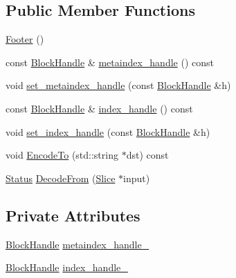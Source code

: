 \subsection*{Public Member Functions}
\begin{DoxyCompactItemize}
\item 
\hyperlink{classleveldb_1_1_footer_ab549912506721bad11eda55be5a04a82}{Footer} ()
\item 
const \hyperlink{classleveldb_1_1_block_handle}{Block\+Handle} \& \hyperlink{classleveldb_1_1_footer_a44f2334ed064f7045d76b898f5fadb6a}{metaindex\+\_\+handle} () const 
\item 
void \hyperlink{classleveldb_1_1_footer_ac937207010f61550c703b2d732422566}{set\+\_\+metaindex\+\_\+handle} (const \hyperlink{classleveldb_1_1_block_handle}{Block\+Handle} \&h)
\item 
const \hyperlink{classleveldb_1_1_block_handle}{Block\+Handle} \& \hyperlink{classleveldb_1_1_footer_aae1a72a668da9eae3fa2f6620e3ea559}{index\+\_\+handle} () const 
\item 
void \hyperlink{classleveldb_1_1_footer_ae2f4be5947f5e4983a160d6d01edea68}{set\+\_\+index\+\_\+handle} (const \hyperlink{classleveldb_1_1_block_handle}{Block\+Handle} \&h)
\item 
void \hyperlink{classleveldb_1_1_footer_ac0148e441c2f25d7d24ec14ba2099f58}{Encode\+To} (std\+::string $\ast$dst) const 
\item 
\hyperlink{classleveldb_1_1_status}{Status} \hyperlink{classleveldb_1_1_footer_a3cbcb311694e4cf410358f97d53d94e3}{Decode\+From} (\hyperlink{classleveldb_1_1_slice}{Slice} $\ast$input)
\end{DoxyCompactItemize}
\subsection*{Private Attributes}
\begin{DoxyCompactItemize}
\item 
\hyperlink{classleveldb_1_1_block_handle}{Block\+Handle} \hyperlink{classleveldb_1_1_footer_acd0ebf81829a0717e2dc832638fc0558}{metaindex\+\_\+handle\+\_\+}
\item 
\hyperlink{classleveldb_1_1_block_handle}{Block\+Handle} \hyperlink{classleveldb_1_1_footer_ab930d9087cd95d58531d7698354f0b7b}{index\+\_\+handle\+\_\+}
\end{DoxyCompactItemize}


